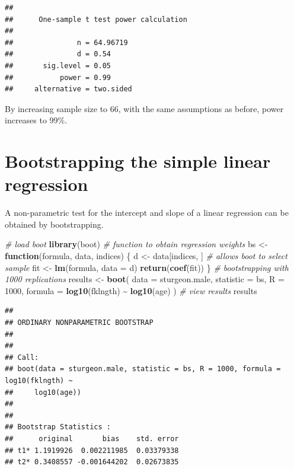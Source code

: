 \documentclass[
  12pt,
]{book}
\newenvironment{Shaded}{\begin{snugshade}}{\end{snugshade}}
\newcommand{\CommentTok}[1]{\textcolor[rgb]{0.56,0.35,0.01}{\textit{#1}}}
\newcommand{\ControlFlowTok}[1]{\textcolor[rgb]{0.13,0.29,0.53}{\textbf{#1}}}
\newcommand{\DataTypeTok}[1]{\textcolor[rgb]{0.13,0.29,0.53}{#1}}
\newcommand{\DecValTok}[1]{\textcolor[rgb]{0.00,0.00,0.81}{#1}}
\newcommand{\KeywordTok}[1]{\textcolor[rgb]{0.13,0.29,0.53}{\textbf{#1}}}
\newcommand{\NormalTok}[1]{#1}
\newcommand{\OperatorTok}[1]{\textcolor[rgb]{0.81,0.36,0.00}{\textbf{#1}}}
\newcommand{\StringTok}[1]{\textcolor[rgb]{0.31,0.60,0.02}{#1}}
\begin{document}
\begin{verbatim}
## 
##      One-sample t test power calculation 
## 
##               n = 64.96719
##               d = 0.54
##       sig.level = 0.05
##           power = 0.99
##     alternative = two.sided
\end{verbatim}

By increasing sample size to 66, with the same assumptions as before, power increases to 99\%.

\hypertarget{bootstrapping-the-simple-linear-regression}{%
\section{Bootstrapping the simple linear regression}\label{bootstrapping-the-simple-linear-regression}}

A non-parametric test for the intercept and slope of a linear regression can be obtained by bootstrapping.

\begin{Shaded}
\begin{Highlighting}[]
\CommentTok{\# load boot}
\KeywordTok{library}\NormalTok{(boot)}
\CommentTok{\# function to obtain regression weights}
\NormalTok{bs \textless{}{-}}\StringTok{ }\ControlFlowTok{function}\NormalTok{(formula, data, indices) \{}
\NormalTok{  d \textless{}{-}}\StringTok{ }\NormalTok{data[indices, ] }\CommentTok{\# allows boot to select sample}
\NormalTok{  fit \textless{}{-}}\StringTok{ }\KeywordTok{lm}\NormalTok{(formula, }\DataTypeTok{data =}\NormalTok{ d)}
  \KeywordTok{return}\NormalTok{(}\KeywordTok{coef}\NormalTok{(fit))}
\NormalTok{\}}
\CommentTok{\# bootstrapping with 1000 replications}
\NormalTok{results \textless{}{-}}\StringTok{ }\KeywordTok{boot}\NormalTok{(}
  \DataTypeTok{data =}\NormalTok{ sturgeon.male,}
  \DataTypeTok{statistic =}\NormalTok{ bs,}
  \DataTypeTok{R =} \DecValTok{1000}\NormalTok{, }\DataTypeTok{formula =} \KeywordTok{log10}\NormalTok{(fklngth) }\OperatorTok{\textasciitilde{}}\StringTok{ }\KeywordTok{log10}\NormalTok{(age)}
\NormalTok{)}
\CommentTok{\# view results}
\NormalTok{results}
\end{Highlighting}
\end{Shaded}

\begin{verbatim}
## 
## ORDINARY NONPARAMETRIC BOOTSTRAP
## 
## 
## Call:
## boot(data = sturgeon.male, statistic = bs, R = 1000, formula = log10(fklngth) ~ 
##     log10(age))
## 
## 
## Bootstrap Statistics :
##      original       bias    std. error
## t1* 1.1919926  0.002211985  0.03379338
## t2* 0.3408557 -0.001644202  0.02673835
\end{verbatim}
\end{document}

